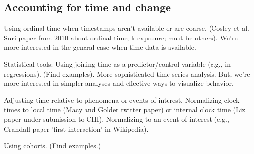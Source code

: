 \subsection{Accounting for time and change}

Using ordinal time when timestamps aren't available or are coarse. (Cosley et al. Suri paper from 2010 about ordinal time; k-exposure; must be others).  We're more interested in the general case when time data is available.  

Statistical tools: Using joining time as a predictor/control variable (e.g., in regressions).  (Find examples).  
More sophisticated time series analysis.  But, we're more interested in simpler analyses and effective ways to visualize behavior.

Adjusting time relative to phenomena or events of interest.  Normalizing clock times to local time (Macy and Golder twitter paper) or internal clock time (Liz paper under submission to CHI).  Normalizing to an event of interest (e.g., Crandall paper 'first interaction' in Wikipedia).  

Using cohorts.  (Find examples.)
\cite{Welser2011a}




